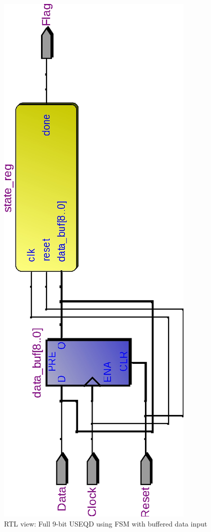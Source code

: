 \documentclass[10pt,a4paper]{report}
\begin{document}
\begin{figure}
\includegraphics[scale=0.8,angle=-90]{graphs/seq_test1.rtl_010110011.eps}
\caption{\small{RTL view: Full 9-bit USEQD using FSM with buffered data input}} \label{wave:usd:2}
\end{figure}
\end{document}
